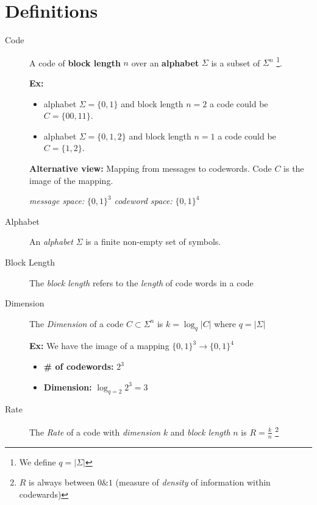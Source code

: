 \section{Definitions}
\begin{description}
    \item[Code] A code of \textbf{block length} $n$ over an \textbf{alphabet} $\Sigma$ is a subset of $\Sigma^n$
        \footnote{We define $q = |\Sigma|$}.

        \textbf{Ex:}
        \begin{itemize}
            \item alphabet $\Sigma = \{0, 1\}$ and block length $n=2$ a code could be $C = \{00, 11\}$.
            \item alphabet $\Sigma = \{0, 1, 2\}$ and block length $n=1$ a code could be $C = \{1, 2\}$.
        \end{itemize}

        \textbf{Alternative view:} Mapping from messages to codewords. Code $C$ is the image of the mapping.

        \textit{message space:} $\{0, 1\}^3$ \textit{codeword space:} $\{0, 1\}^4$
    \item[Alphabet] An \textit{alphabet} $\Sigma$ is a finite non-empty set of symbols.
    \item[Block Length] The \textit{block length} refers to the \textit{length} of code words in a code
    \item[Dimension] The \textit{Dimension} of a code $C \subset \Sigma^n$ is $k = \log_q{|C|}$
        where $q = |\Sigma|$

        \textbf{Ex:} We have the image of a mapping $\{0, 1\}^3 \rightarrow \{0, 1\}^4$
        \begin{itemize}
            \item \textbf{\# of codewords:} $2^3$ 
            \item \textbf{Dimension:} $\log_{q=2}{2^3} = 3$
        \end{itemize}
    \item[Rate] The \textit{Rate} of a code with \textit{dimension} $k$ and \textit{block length} $n$ is $R = \frac{k}{n}$
        \footnote{$R$ is always between $0 \& 1$ (measure of \textit{density} of information within codewards)}


\end{description}
